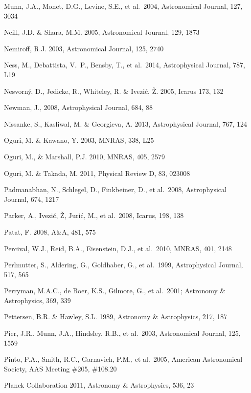 \documentclass{emulateapj}
\begin{document}
\begin{thebibliography}{}
\bibitem[()]{} Munn, J.A., Monet, D.G., Levine, S.E., et al.~2004, Astronomical Journal, 127, 3034
	
\bibitem[()]{} Neill, J.D. \& Shara, M.M. 2005, Astronomical Journal, 129, 1873

\bibitem[()]{} Nemiroff, R.J. 2003, Astronomical Journal, 125, 2740

\bibitem[()]{} Ness, M., Debattista, V.~P., Bensby, T., et al.~2014, Astrophysical Journal, 787, L19

\bibitem[()]{} Nesvorn\'{y}, D., Jedicke, R., Whiteley, R. \& Ivezi\'{c}, \v{Z}. 2005, Icarus 173, 132

\bibitem[()]{} Newman, J., 2008, Astrophysical Journal, 684, 88

\bibitem[()]{} Nissanke, S., Kasliwal, M. \& Georgieva, A. 2013,  Astrophysical Journal, 767, 124 

\bibitem[()]{} Oguri, M. \& Kawano, Y. 2003, MNRAS, 338, L25 

\bibitem[()]{} Oguri, M., \& Marshall, P.J. 2010, MNRAS, 405, 2579

\bibitem[()]{} Oguri, M. \& Takada, M. 2011, Physical Review D, 83, 023008

\bibitem[()]{} Padmanabhan, N., Schlegel, D., Finkbeiner, D., et al.~2008, Astrophysical Journal, 674, 1217

\bibitem[()]{} Parker, A., Ivezi\'{c}, \v{Z}, Juri\'{c}, M., et al.~2008, Icarus, 198, 138

\bibitem[()]{} Patat, F. 2008, A\&A, 481, 575

\bibitem[()]{} Percival, W.J., Reid, B.A., Eisenstein, D.J., et al.~2010, MNRAS, 401, 2148 

\bibitem[()]{} Perlmutter, S., Aldering, G., Goldhaber, G., et al.~1999, Astrophysical Journal, 517, 565

\bibitem[()]{} Perryman, M.A.C., de Boer, K.S., Gilmore, G., et al.~2001; Astronomy \& 
             Astrophysics, 369, 339

\bibitem[()]{} Pettersen, B.R. \& Hawley, S.L. 1989, Astronomy \& Astrophysics, 217, 187

\bibitem[()]{} Pier, J.R., Munn, J.A., Hindsley, R.B., et al.~2003, Astronomical Journal, 125, 1559

\bibitem[()]{} Pinto, P.A., Smith, R.C., Garnavich, P.M., et al.~2005, 
              American Astronomical Society, AAS Meeting \#205, \#108.20

\bibitem[()]{} Planck Collaboration 2011,  Astronomy \& Astrophysics, 536, 23 


\end{thebibliography}
\end{document}
